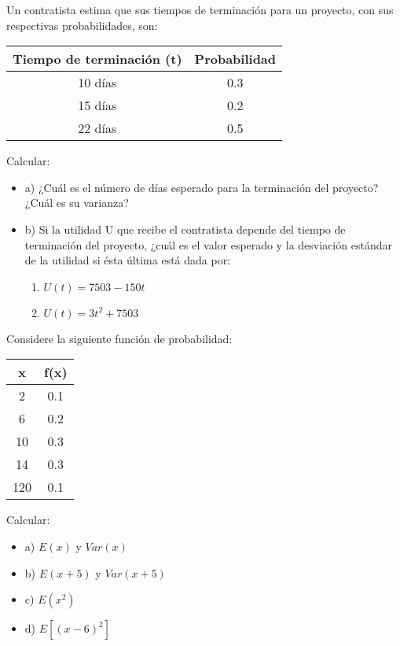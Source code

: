 \documentclass{../oxmathproblems}
\begin{document}
\begin{questions}

\miquestion Un contratista estima que sus tiempos de terminación para un proyecto, con sus respectivas probabilidades, son: 

\begin{center}
\begin{tabular}{ |c|c| } 
 \hline
 \textbf{Tiempo de terminación (t)} & \textbf{Probabilidad} \\ 
 \hline
 10 días  & 0.3 \\
 15 días  & 0.2 \\
 22 días & 0.5\\ 
 \hline
\end{tabular}
\end{center}


Calcular: 

\begin{itemize}
\item a) ¿Cuál es el número de días esperado para la terminación del proyecto?¿Cuál es su varianza?
\item b) Si la utilidad U que recibe el contratista depende del tiempo de terminación del proyecto, ¿cuál es el valor esperado y la desviación estándar de la utilidad si ésta última está dada por: 
\begin{enumerate}
\item  $U(t) = 7503 - 150t $
\item $U(t) = 3t^2 + 7503 $ 

\end{enumerate}
\end{itemize}

\miquestion Considere la siguiente función de probabilidad: 

\begin{center}
\begin{tabular}{ |c|c| } 
 \hline
 \textbf{x} & \textbf{f(x)} \\ 
 \hline
 2  & 0.1 \\
6  & 0.2 \\
 10 & 0.3\\ 
  14 & 0.3\\ 
   120 & 0.1\\ 
 \hline
\end{tabular}
\end{center}


Calcular: 

\begin{itemize}
\item a) $E(x)$ y $Var(x)$
\item b) $E(x+5)$ y $Var(x+5)$
\item c) $E(x^2)$
\item d) $E[(x-6)^2]$
\end{itemize}



\end{questions}
\end{document}
